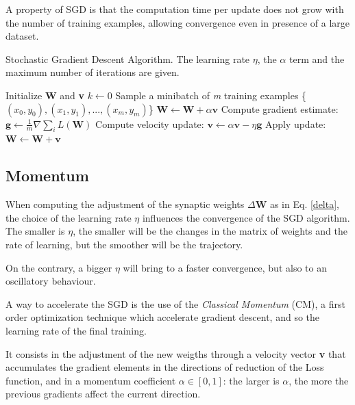 		A property of SGD is that the computation time per update does not grow with the number of training
		examples, allowing convergence even in presence of a large dataset.

		\begin{algorithm}[H]
			\caption{Stochastic Gradient Descent Algorithm. The learning rate $\eta$, the $\alpha$ term and the maximum number of iterations are given.}
			\label{alg:sgd}
			\begin{algorithmic}[1]
					\State Initialize \textbf{W} and \textbf{v}
					\State $k \gets 0$
						\State Sample a minibatch of \textit{m} training examples \{\textit{$(x_0,y_0),(x_1,y_1),...,(x_m,y_m)$}\}
							\State $\textbf{W} \gets \textbf{W} + \alpha \textbf{v}$
						\EndIf
						\State Compute gradient estimate: $\textbf{g} \gets \frac {1}{m} \nabla \sum_i\textit{L}(\textbf{W})$
						\State Compute velocity update: $\textbf{v} \gets \alpha \textbf{v} - \eta \textbf{g}$
						\State Apply update: $\textbf{W} \gets \textbf{W} + \textbf{v}$
					\EndWhile
				\EndProcedure
			\end{algorithmic}
		\end{algorithm}


		\subsection{Momentum}
		\label{sec:momentum}
			When computing the adjustment of the synaptic weights $\Delta\textbf{W}$ as in Eq. \ref{delta}, the choice of the learning rate $\eta$ influences the convergence of the SGD algorithm.
			The smaller is $\eta$, the smaller will be the changes in the matrix of weights and the rate of learning, but the smoother will be the trajectory.

			On the contrary, a bigger $\eta$ will bring to a faster convergence, but also to an oscillatory behaviour.

			A way to accelerate the SGD is the use of the \textit{Classical Momentum} (CM), a first order optimization technique which accelerate gradient descent, and so the learning rate of the final training.

			It consists in the adjustment of the new weigths through a velocity vector \textbf{v} that accumulates the gradient elements in the directions of reduction of the Loss function, and in a momentum coefficient $\alpha \in [0,1]$: the larger is  $\alpha$, the more the previous gradients affect the current direction.

